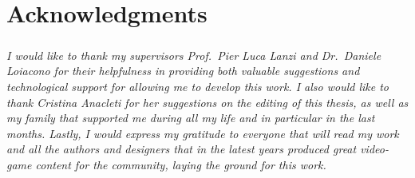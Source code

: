 \chapter*{Acknowledgments}
\paragraph{} \textit{
	I would like to thank my supervisors Prof.~Pier Luca Lanzi and Dr.~Daniele Loiacono for their helpfulness in providing both valuable suggestions and technological support for allowing me to develop this work. I also would like to thank Cristina Anacleti for her suggestions on the editing of this thesis, as well as my family that supported me during all my life and in particular in the last months. Lastly, I would express my gratitude to everyone that will read my work and all the authors and designers that in the latest years produced great video-game content for the community, laying the ground for this work.
	}